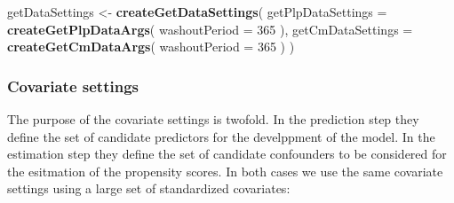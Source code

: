 \documentclass[]{article}
\newenvironment{Shaded}{\begin{snugshade}}{\end{snugshade}}
\newcommand{\DataTypeTok}[1]{\textcolor[rgb]{0.13,0.29,0.53}{#1}}
\newcommand{\DecValTok}[1]{\textcolor[rgb]{0.00,0.00,0.81}{#1}}
\newcommand{\KeywordTok}[1]{\textcolor[rgb]{0.13,0.29,0.53}{\textbf{#1}}}
\newcommand{\NormalTok}[1]{#1}
\newcommand{\StringTok}[1]{\textcolor[rgb]{0.31,0.60,0.02}{#1}}
\begin{document}
\begin{Shaded}
\begin{Highlighting}[]
\NormalTok{getDataSettings <{-}}\StringTok{ }\KeywordTok{createGetDataSettings}\NormalTok{(}
  \DataTypeTok{getPlpDataSettings =} \KeywordTok{createGetPlpDataArgs}\NormalTok{(}
    \DataTypeTok{washoutPeriod =} \DecValTok{365}
\NormalTok{  ),}
  \DataTypeTok{getCmDataSettings =} \KeywordTok{createGetCmDataArgs}\NormalTok{(}
    \DataTypeTok{washoutPeriod =} \DecValTok{365}
\NormalTok{  )}
\NormalTok{)}
\end{Highlighting}
\end{Shaded}

\hypertarget{covariate-settings}{%
\subsubsection{Covariate settings}\label{covariate-settings}}

The purpose of the covariate settings is twofold. In the prediction step
they define the set of candidate predictors for the develppment of the
model. In the estimation step they define the set of candidate
confounders to be considered for the esitmation of the propensity
scores. In both cases we use the same covariate settings using a large
set of standardized covariates:
\end{document}
